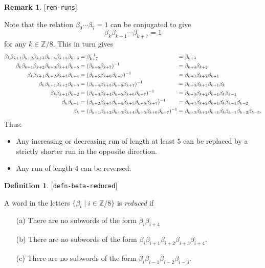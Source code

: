 \documentclass[reqno]{amsart}
\newcommand{\lbl}[1]{\label{#1}\textup{[\texttt{#1}]}\par}
\newcommand{\lbl}{\label}
\newcommand{\bt}        {\beta}
\newcommand{\Z}         {{\mathbb{Z}}}
\newcommand{\st}        {\;|\;}
\renewcommand{\:}{\colon}
\theoremstyle{definition}
\newtheorem{remark}[theorem]{Remark}
\newtheorem{definition}[theorem]{Definition}
\begin{document}
\begin{remark}\lbl{rem-runs}
 Note that the relation $\bt_0\dotsb\bt_7=1$ can be conjugated to give
 \[ \bt_k\bt_{k+1}\dotsb\bt_{k+7} = 1 \]
 for any $k\in\Z/8$.  This in turn gives
 \begin{align*}
  \bt_k\bt_{k+1}\bt_{k+2}\bt_{k+3}\bt_{k+4}\bt_{k+5}\bt_{k+6} &=
   \bt_{k+7}^{-1} &&\hspace{-1em}=
   \bt_{k+3} \\
  \bt_k\bt_{k+1}\bt_{k+2}\bt_{k+3}\bt_{k+4}\bt_{k+5} &=
   (\bt_{k+6}\bt_{k+7})^{-1} &&\hspace{-1em}=
   \bt_{k+3}\bt_{k+2} \\
  \bt_k\bt_{k+1}\bt_{k+2}\bt_{k+3}\bt_{k+4} &=
   (\bt_{k+5}\bt_{k+6}\bt_{k+7})^{-1} &&\hspace{-1em}=
   \bt_{k+3}\bt_{k+2}\bt_{k+1} \\
  \bt_k\bt_{k+1}\bt_{k+2}\bt_{k+3} &=
   (\bt_{k+4}\bt_{k+5}\bt_{k+6}\bt_{k+7})^{-1} &&\hspace{-1em}=
   \bt_{k+3}\bt_{k+2}\bt_{k+1}\bt_k \\
  \bt_k\bt_{k+1}\bt_{k+2} &=
   (\bt_{k+3}\bt_{k+4}\bt_{k+5}\bt_{k+6}\bt_{k+7})^{-1} &&\hspace{-1em}=
   \bt_{k+3}\bt_{k+2}\bt_{k+1}\bt_k\bt_{k-1} \\
  \bt_k\bt_{k+1} &=
   (\bt_{k+2}\bt_{k+3}\bt_{k+4}\bt_{k+5}\bt_{k+6}\bt_{k+7})^{-1} &&\hspace{-1em}=
   \bt_{k+3}\bt_{k+2}\bt_{k+1}\bt_k\bt_{k-1}\bt_{k-2} \\
  \bt_k &=
   (\bt_{k+1}\bt_{k+2}\bt_{k+3}\bt_{k+4}\bt_{k+5}\bt_{k+6}\bt_{k+7})^{-1} &&\hspace{-1em}=
   \bt_{k+3}\bt_{k+2}\bt_{k+1}\bt_k\bt_{k-1}\bt_{k-2}\bt_{k-3}.
 \end{align*}
 Thus:
 \begin{itemize}
  \item Any increasing or decreasing run of length at least $5$ can be
   replaced by a strictly shorter run in the opposite direction.
  \item Any run of length $4$ can be reversed.
 \end{itemize}
\end{remark}

\begin{definition}\lbl{defn-beta-reduced}
 A word in the letters $\{\bt_i\st i\in\Z/8\}$ is \emph{reduced} if
 \begin{itemize}
  \item[(a)] There are no subwords of the form $\bt_i\bt_{i+4}$
  \item[(b)] There are no subwords of the form
   $\bt_i\bt_{i+1}\bt_{i+2}\bt_{i+3}\bt_{i+4}$.
  \item[(c)] There are no subwords of the form
   $\bt_i\bt_{i-1}\bt_{i-2}\bt_{i-3}$.
 \end{itemize}
\end{definition}
\end{document}

